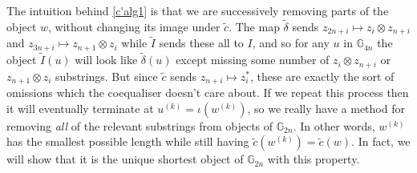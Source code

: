 The intuition behind \cref{c'alg1} is that we are successively removing parts of the object $w$, without changing its image under $\tilde{c}$. The map $\tilde{\delta}$ sends $z_{2n+i} \mapsto z_i \otimes z_{n+i}$ and $z_{3n+i} \mapsto z_{n+1} \otimes z_i$ while $\tilde{I}$ sends these all to $I$, and so for any $u$ in $\mathbb{G}_{4n}$ the object $\tilde{I}(u)$ will look like $\tilde{\delta}(u)$ except missing some number of $z_i \otimes z_{n+i}$ or $z_{n+1} \otimes z_i$ substrings. But since $\tilde{c}$ sends $z_{n+i} \mapsto z_i^*$, these are exactly the sort of omissions which the coequaliser doesn't care about. If we repeat this process then it will eventually terminate at $u^{(k)} = \iota(w^{(k)})$, so we really have a method for removing \emph{all} of the relevant substrings from objects of $\mathbb{G}_{2n}$. In other words, $w^{(k)}$ has the smallest possible length while still having $\tilde{c}(w^{(k)}) = \tilde{c}(w)$. In fact, we will show that it is the unique shortest object of $\mathbb{G}_{2n}$ with this property.


